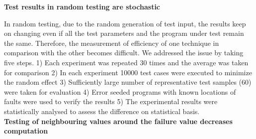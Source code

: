 








\textbf{Test results in random testing are stochastic} 

In random testing, due to the random generation of test input, the results keep on changing even if all the test parameters and the program under test remain the same. Therefore, the measurement of efficiency of one technique in comparison with the other becomes difficult. We addressed  the issue by taking five steps. 1) Each experiment was repeated 30 times and the average was taken for comparison 2) In each experiment 10000 test cases were executed to minimize the random effect 3) Sufficiently large number of representative test samples (60) were taken for evaluation 4) Error seeded programs with known locations of faults were used to verify the results 5) The experimental results were statistically analysed to assess the difference on statistical basis.\\


   
\textbf{Testing of neighbouring values around the failure value decreases computation}

